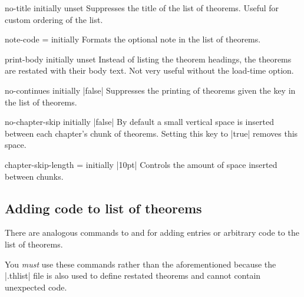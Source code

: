 \documentclass{ltxdoc}
\newcommand{\ttbraces}[1]{\braces{\texttt{#1}}}
\begin{document}
\begin{docKey}{no-title}
  {}
  {initially unset}
Suppresses the title of the list of theorems. Useful for custom ordering of the list.

\begin{keythmscode}[]
\listofkeytheorems[show=example]
\listofkeytheorems[show=solution,no-title]
\end{keythmscode}

\end{docKey}

\begin{docKey}{note-code}
  {=}
  {initially \ttbraces{ (\#1)}}
Formats the optional note in the list of theorems.
\end{docKey}

\begin{docKey}{print-body}
  {}
  {initially unset}
Instead of listing the theorem headings, the theorems are restated with their body text. Not very useful without the  load-time option.
\end{docKey}

\begin{docKey}{no-continues}
  {}
  {initially |false|}
Suppresses the printing of theorems given the  key in the list of theorems.
\end{docKey}

\begin{docKey}{no-chapter-skip}
  {}
  {initially |false|}
By default a small vertical space is inserted between each chapter's chunk of theorems. Setting this key to |true| removes this space.
\end{docKey}

\begin{docKey}{chapter-skip-length}
  {=}
  {initially |10pt|}
Controls the amount of space inserted between chunks.
\end{docKey}

\subsection{Adding code to list of theorems}

There are analogous commands to  and  for
adding entries or arbitrary code to the list of theorems.

\begin{notebox}
You \emph{must} use these commands rather than the aforementioned because the
|.thlist| file is also used to define restated theorems and cannot contain
unexpected code.
\end{notebox}
\end{document}
